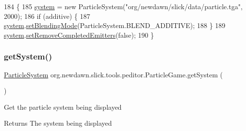 \begin{DoxyCode}
184                                               \{
185         \mbox{\hyperlink{classorg_1_1newdawn_1_1slick_1_1tools_1_1peditor_1_1_particle_game_a3a6d42e312039ae4f175e6751256f2f7}{system}} = \textcolor{keyword}{new} ParticleSystem(\textcolor{stringliteral}{"org/newdawn/slick/data/particle.tga"}, 2000);
186         \textcolor{keywordflow}{if} (additive) \{
187             \mbox{\hyperlink{classorg_1_1newdawn_1_1slick_1_1tools_1_1peditor_1_1_particle_game_a3a6d42e312039ae4f175e6751256f2f7}{system}}.\mbox{\hyperlink{classorg_1_1newdawn_1_1slick_1_1particles_1_1_particle_system_a430d7e9a09b132694497f4e6075cd58c}{setBlendingMode}}(ParticleSystem.BLEND\_ADDITIVE);
188         \}
189         \mbox{\hyperlink{classorg_1_1newdawn_1_1slick_1_1tools_1_1peditor_1_1_particle_game_a3a6d42e312039ae4f175e6751256f2f7}{system}}.\mbox{\hyperlink{classorg_1_1newdawn_1_1slick_1_1particles_1_1_particle_system_af471c877884c73411ed37a28755b62b0}{setRemoveCompletedEmitters}}(\textcolor{keyword}{false});
190     \}
\end{DoxyCode}
\mbox{\label{classorg_1_1newdawn_1_1slick_1_1tools_1_1peditor_1_1_particle_game_a863b0f3f5c65d561161edf6bfc6c1d8f}} 
\subsubsection{\texorpdfstring{get\+System()}{getSystem()}}
{\footnotesize\ttfamily \mbox{\hyperlink{classorg_1_1newdawn_1_1slick_1_1particles_1_1_particle_system}{Particle\+System}} org.\+newdawn.\+slick.\+tools.\+peditor.\+Particle\+Game.\+get\+System (\begin{DoxyParamCaption}{ }\end{DoxyParamCaption})\hspace{0.3cm}{\ttfamily [inline]}}

Get the particle system being displayed

\begin{DoxyReturn}{Returns}
The system being displayed 
\end{DoxyReturn}

